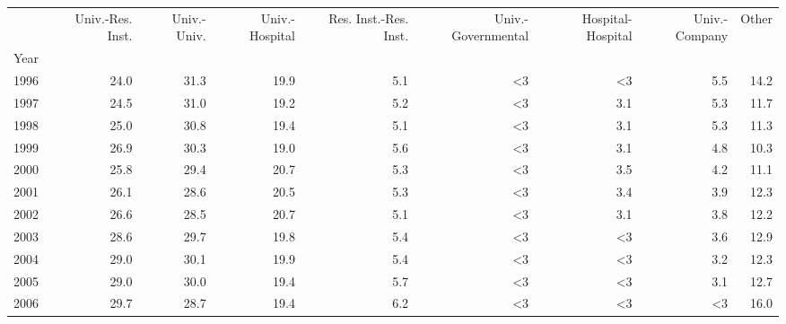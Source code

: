 \begin{tabular}{lrrrrrrrr}
\toprule
{} &  Univ.-Res. Inst. &  Univ.-Univ. &  Univ.-Hospital &  Res. Inst.-Res. Inst. &  Univ.-Governmental &  Hospital-Hospital &  Univ.-Company &  Other \\
Year &                   &              &                 &                        &                     &                    &                &        \\
\midrule
1996 &              24.0 &         31.3 &            19.9 &                    5.1 &                  <3 &                 <3 &            5.5 &   14.2 \\
1997 &              24.5 &         31.0 &            19.2 &                    5.2 &                  <3 &                3.1 &            5.3 &   11.7 \\
1998 &              25.0 &         30.8 &            19.4 &                    5.1 &                  <3 &                3.1 &            5.3 &   11.3 \\
1999 &              26.9 &         30.3 &            19.0 &                    5.6 &                  <3 &                3.1 &            4.8 &   10.3 \\
2000 &              25.8 &         29.4 &            20.7 &                    5.3 &                  <3 &                3.5 &            4.2 &   11.1 \\
2001 &              26.1 &         28.6 &            20.5 &                    5.3 &                  <3 &                3.4 &            3.9 &   12.3 \\
2002 &              26.6 &         28.5 &            20.7 &                    5.1 &                  <3 &                3.1 &            3.8 &   12.2 \\
2003 &              28.6 &         29.7 &            19.8 &                    5.4 &                  <3 &                 <3 &            3.6 &   12.9 \\
2004 &              29.0 &         30.1 &            19.9 &                    5.4 &                  <3 &                 <3 &            3.2 &   12.3 \\
2005 &              29.0 &         30.0 &            19.4 &                    5.7 &                  <3 &                 <3 &            3.1 &   12.7 \\
2006 &              29.7 &         28.7 &            19.4 &                    6.2 &                  <3 &                 <3 &             <3 &   16.0 \\

\end{tabular}
